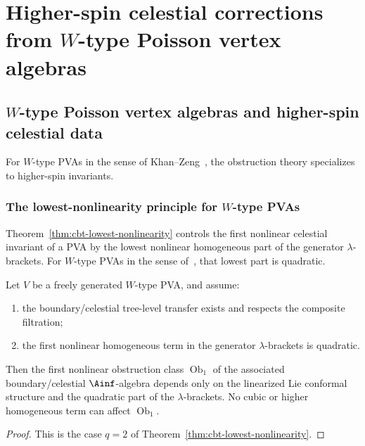 \chapter{Higher-spin celestial corrections from $W$-type Poisson vertex algebras}
\label{ch:celestial-boundary-transfer-frontier}

\section{$W$-type Poisson vertex algebras and higher-spin celestial data}
\label{sec:cbt-w-type}

For $W$-type PVAs in the sense of Khan--Zeng~\cite{KZ25}, the obstruction theory specializes to higher-spin invariants.

\subsection{The lowest-nonlinearity principle for $W$-type PVAs}
\label{sec:cbt-abstract-w-type}

Theorem~\ref{thm:cbt-lowest-nonlinearity} controls the first nonlinear celestial invariant of a PVA by the lowest nonlinear homogeneous part of the generator $\lambda$-brackets. For $W$-type PVAs in the sense of~\cite{KZ25}, that lowest part is quadratic.

\begin{corollary}
\label{cor:cbt-w-type-quadratic}
\ClaimStatusConditional
Let $V$ be a freely generated $W$-type PVA, and assume:
\begin{enumerate}[label=\textup{(\roman*)},leftmargin=2em]
\item the boundary/celestial tree-level transfer exists and respects the composite filtration;
\item the first nonlinear homogeneous term in the generator $\lambda$-brackets is quadratic.
\end{enumerate}
Then the first nonlinear obstruction class $\operatorname{Ob}_1$ of the associated boundary/celestial $\Ainf$-algebra depends only on the linearized Lie conformal structure and the quadratic part of the $\lambda$-brackets. No cubic or higher homogeneous term can affect $\operatorname{Ob}_1$.
\end{corollary}

\begin{proof}
This is the case $q=2$ of Theorem~\ref{thm:cbt-lowest-nonlinearity}.
\end{proof}

